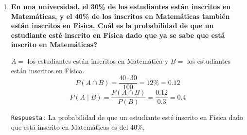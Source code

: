 \documentclass[12pt]{article}
\begin{document}
\begin{enumerate}[label=\textbf{\arabic*.}]
        \item \textbf{En una universidad, el 30\% de los estudiantes están inscritos en Matemáticas, y
        el 40\% de los inscritos en Matemáticas también están inscritos en Física. \textquestiondown Cuál
        es la probabilidad de que un estudiante esté inscrito en Física dado que ya se
        sabe que está inscrito en Matemáticas?}

        $A = $ los estudiantes están inscritos en Matemática y $B = $ los estudiantes están inscritos en Física.\\

        \[P(A \cap B) = \frac{40 \cdot 30}{100} = 12\% = 0.12\]
        \[P(A \mid B) = \frac{P(A \cap B)}{P(B)} = \frac{0.12}{0.3} = 0.4\]

        \texttt{Respuesta:} La probabilidad de que un estudiante esté inscrito en Física dado que 
         está inscrito en Matemáticas es del 40\%.

    \end{enumerate}
\end{document}

